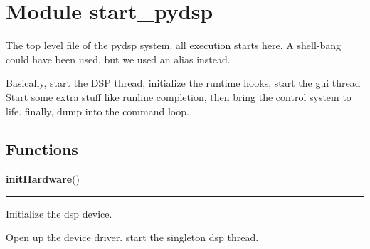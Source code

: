 %
%
%


\section{Module start\_pydsp}

    \label{start_pydsp}
The top level file of the pydsp system. all execution starts here. A 
shell-bang could have been used, but we used an alias instead.

Basically, start the DSP thread, initialize the runtime hooks, start the 
gui thread Start some extra stuff like runline completion, then bring the 
control system to life. finally, dump into the command loop.



  \subsection{Functions}

    \label{start_pydsp:initHardware}

    \vspace{0.5ex}

    \begin{boxedminipage}{\textwidth}

    \raggedright \textbf{initHardware}()

    \vspace{-1.5ex}

    \rule{\textwidth}{0.5\fboxrule}
    Initialize the dsp device.

    Open up the device driver. start the singleton dsp thread.

    \vspace{1ex}

    \end{boxedminipage}

